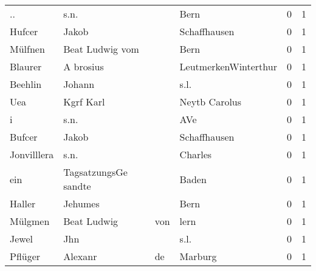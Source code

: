 \documentclass[10pt,a4paper,landscape]{article}
\begin{document}
\begin{longtable}{llllrr}
                       .. &                               s.n. &             &                                        Bern &          0 &         1 \\
                   Hufcer &                              Jakob &             &                                Schaffhausen &          0 &         1 \\
                  Mülfnen &                    Beat Ludwig vom &             &                                        Bern &          0 &         1 \\
                  Blaurer &                          A brosius &             &                        LeutmerkenWinterthur &          0 &         1 \\
                  Beehlin &                             Johann &             &                                        s.l. &          0 &         1 \\
                      Uea &                          Kgrf Karl &             &                               Neytb Carolus &          0 &         1 \\
                        i &                               s.n. &             &                                         AVe &          0 &         1 \\
                   Bufcer &                              Jakob &             &                                Schaffhausen &          0 &         1 \\
              Jonvilllera &                               s.n. &             &                                     Charles &          0 &         1 \\
                      ein &               TagsatzungsGe sandte &             &                                       Baden &          0 &         1 \\
                   Haller &                            Jehumes &             &                                        Bern &          0 &         1 \\
                  Mülgmen &                        Beat Ludwig &         von &                                        lern &          0 &         1 \\
                    Jewel &                                Jhn &             &                                        s.l. &          0 &         1 \\
                  Pflüger &                            Alexanr &          de &                                     Marburg &          0 &         1 \\

\end{longtable}
\end{document}
